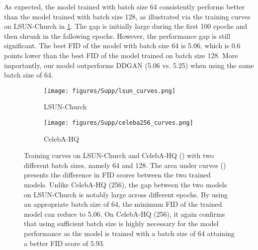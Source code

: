 \documentclass[10pt,twocolumn,letterpaper]{article}
\begin{document}
As expected, the model trained with batch size 64 consistently performs better than the model trained with batch size 128, as illustrated via the training curves on LSUN-Church in \cref{fig:lsun_curves}. The gap is initially large during the first 100 epochs and then shrunk in the following epochs. However, the performance gap is still significant. The best FID of the model with batch size 64 is 5.06, which is 0.6 points lower than the best FID of the model trained on batch size 128. More importantly, our model outperforms DDGAN (5.06 vs. 5.25) when using the same batch size of 64.

\begin{figure}[t]
  \centering
   \begin{subfigure}[b]{0.85\linewidth}
         \centering
         \texttt{[image: figures/Supp/lsun\_curves.png]}
         \caption{LSUN-Church}
         \label{fig:lsun_curves}
   \end{subfigure}
   \hfill
   \begin{subfigure}[b]{0.85\linewidth}
         \centering
         \texttt{[image: figures/Supp/celeba256\_curves.png]}
         \caption{CelebA-HQ}
         \label{fig:cel_curves}
   \end{subfigure}
   

   \caption{Training curves on LSUN-Church and CelebA-HQ () with two different batch sizes, namely 64 and 128. The area under curves () presents the difference in FID scores between the two trained models. Unlike CelebA-HQ (256), the gap between the two models on LSUN-Church is notably large across different epochs. By using an appropriate batch size of 64, the minimum FID of the trained model can reduce to 5.06. On CelebA-HQ (256), it again confirms that using sufficient batch size is highly necessary for the model performance as the model is trained with a batch size of 64 attaining a better FID score of 5.93.}
   \label{fig:training_curves}
\end{figure}
\end{document}
